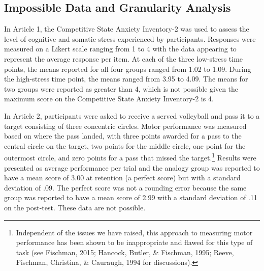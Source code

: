 \documentclass[
  english,
  man, donotrepeattitle,floatsintext]{apa7}
\begin{document}
\hypertarget{impossible-data-and-granularity-analysis}{%
\subsection{Impossible Data and Granularity Analysis}\label{impossible-data-and-granularity-analysis}}

In Article 1, the Competitive State Anxiety Inventory-2 was used to assess the level of cognitive and somatic stress experienced by participants. Responses were measured on a Likert scale ranging from 1 to 4 with the data appearing to represent the average response per item. At each of the three low-stress time points, the means reported for all four groups ranged from 1.02 to 1.09. During the high-stress time point, the means ranged from 3.95 to 4.09. The means for two groups were reported as greater than 4, which is not possible given the maximum score on the Competitive State Anxiety Inventory-2 is 4.

In Article 2, participants were asked to receive a served volleyball and pass it to a target consisting of three concentric circles. Motor performance was measured based on where the pass landed, with three points awarded for a pass to the central circle on the target, two points for the middle circle, one point for the outermost circle, and zero points for a pass that missed the target.\footnote{Independent of the issues we have raised, this approach to measuring motor performance has been shown to be inappropriate and flawed for this type of task (see Fischman, 2015; Hancock, Butler, \& Fischman, 1995; Reeve, Fischman, Christina, \& Cauraugh, 1994 for discussions).} Results were presented as average performance per trial and the analogy group was reported to have a mean score of 3.00 at retention (a perfect score) but with a standard deviation of .09. The perfect score was not a rounding error because the same group was reported to have a mean score of 2.99 with a standard deviation of .11 on the post-test. These data are not possible.
\end{document}
